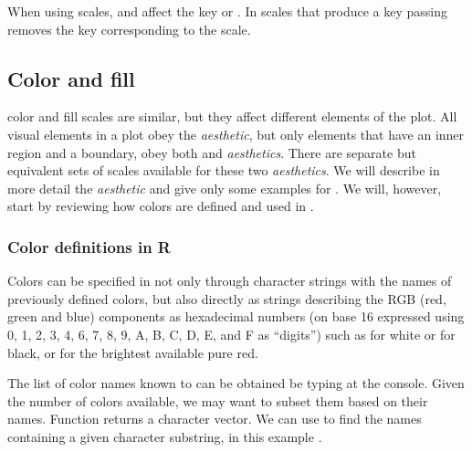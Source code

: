 \documentclass[krantz2]{krantz}\usepackage{knitr}
\begin{document}
When using  scales,  and  affect the key or . In scales that produce a key passing  removes the key corresponding to the scale.

\subsection{Color and fill}

color and fill scales are similar, but they affect different elements of the plot. All visual elements in a plot obey the  \emph{aesthetic}, but only elements that have an inner region and a boundary, obey both  and  \emph{aesthetics}. There are separate but equivalent sets of scales available for these two \emph{aesthetics}. We will describe in more detail the  \emph{aesthetic} and give only some examples for . We will, however, start by reviewing how colors are defined and used in \Rlang.

\subsubsection{Color definitions in R}\label{sec:plot:colors}
Colors can be specified in \Rlang not only through character strings with the names of previously defined colors, but also directly as strings describing the RGB (red, green and blue) components as hexadecimal numbers (on base 16 expressed using 0, 1, 2, 3, 4, 6, 7, 8, 9, A, B, C, D, E, and F as ``digits'') such as  for white or  for black, or  for the brightest available pure red.

The list of color names known to \Rlang can be obtained be typing  at the \Rlang console.
Given the number of colors available, we may want to subset them based on their names. Function  returns a character vector. We can use  to find the names containing a given character substring, in this example .
\end{document}
